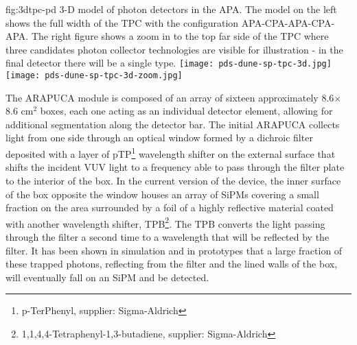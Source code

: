 \begin{dunefigure}{fig:3dtpc-pd}
{3-D model of photon detectors in the APA. The model on the left shows the full width of the TPC with the configuration APA-CPA-APA-CPA-APA. The right figure shows a zoom in to the top far side of the TPC where three candidates photon collector technologies are visible for illustration - in the final detector there will be a single type.}
\texttt{[image: pds-dune-sp-tpc-3d.jpg]}
\texttt{[image: pds-dune-sp-tpc-3d-zoom.jpg]}
\end{dunefigure}



The ARAPUCA module is composed of an array of sixteen approximately 8.6$\times$8.6 cm$^2$ boxes, 
 each one acting as an individual detector element, allowing for additional segmentation along the detector bar. 
The initial ARAPUCA collects light from one side through an optical window formed  
by a dichroic filter deposited with a layer of pTP\footnote{p-TerPhenyl,  supplier: Sigma-Aldrich\textregistered}
wavelength shifter on the external surface that shifts the incident VUV light to a frequency able to pass through the filter plate to the interior of the box.  
In the current version of the device, the inner surface of the box opposite the window houses an array of SiPMs covering a small fraction on the area surrounded by a foil of a highly reflective material coated with another wavelength shifter, TPB\footnote{1,1,4,4-Tetraphenyl-1,3-butadiene, supplier: Sigma-Aldrich\textregistered}. The TPB
converts the light passing through the filter a second time to a wavelength that will be reflected by the filter. It has been shown in simulation and in prototypes that a large fraction of these trapped photons, reflecting from the filter and the lined walls of the box, will eventually fall on an SiPM and be detected.

